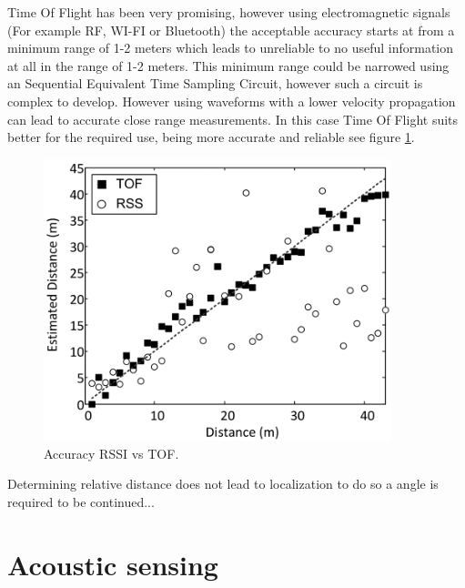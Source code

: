 \documentclass[10pt,a4paper]{article}
\begin{document}
Time Of Flight has been very promising, however using electromagnetic signals (For example RF, WI-FI or Bluetooth) the acceptable accuracy starts at from a minimum range of 1-2 meters which leads to unreliable to no useful information at all in the range of 1-2 meters. This minimum range could be narrowed using an Sequential Equivalent Time Sampling Circuit, however such a circuit is complex to develop. However using waveforms with a lower velocity propagation can lead to accurate close range measurements. In this case Time Of Flight suits better for the required use, being more accurate and reliable see figure \ref{RSSIvsTOF}.\cite{TOF}

\begin{figure}[H]
\centering
\includegraphics[width=0.9\textwidth]{RSSIvsTOF.pdf}
\caption{Accuracy RSSI vs TOF.\cite{TOF}} 
\label{RSSIvsTOF}
\end{figure}

Determining relative distance does not lead to localization to do so a angle is required to be continued... 
\newpage

\section{Acoustic sensing}
\end{document}
